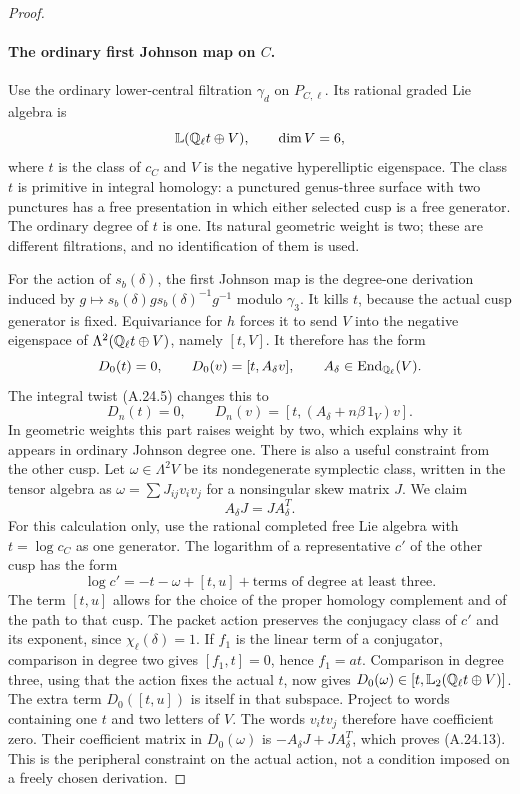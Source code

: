 \begin{proof}
\paragraph{The ordinary first Johnson map on $C$.}
Use the ordinary lower-central filtration $\gamma_d$ on
$P_{C,\ell}$. Its rational graded Lie algebra is
\[
                  \mathbb L(\mathbb Q_\ell t\oplus V),\qquad
                         \dim V=6,
\]
where $t$ is the class of $c_C$ and $V$ is the negative
hyperelliptic eigenspace. The class $t$ is primitive in
integral homology: a punctured genus-three surface with
two punctures has a free presentation in which either
selected cusp is a free generator.
The ordinary degree of $t$ is one. Its natural geometric
weight is two; these are different filtrations, and no
identification of them is used.

For the action of $s_b(\delta)$, the first Johnson map is
the degree-one derivation induced by
$g\mapsto s_b(\delta)g s_b(\delta)^{-1}g^{-1}$
modulo $\gamma_3$. It kills $t$, because the actual cusp
generator is fixed. Equivariance for $h$ forces it to send
$V$ into the negative eigenspace of
$\Lambda^2(\mathbb Q_\ell t\oplus V)$, namely $[t,V]$.
It therefore has the form
\[
             D_0(t)=0,\qquad D_0(v)=[t,A_\delta v],
                \qquad A_\delta\in\operatorname{End}_{\mathbb Q_\ell}(V).
\]
The integral twist (A.24.5) changes this to
\[
       D_n(t)=0,\qquad
       D_n(v)=[t,(A_\delta+n\beta\,1_V)v].               \tag{A.24.8}
\]
In geometric weights this part raises weight by two, which
explains why it appears in ordinary Johnson degree one.
There is also a useful constraint from the other cusp.
Let $\omega\in\Lambda^2V$ be its nondegenerate symplectic
class, written in the tensor algebra as
$\omega=\sum J_{ij}v_iv_j$ for a nonsingular skew matrix
$J$. We claim
\[
                         A_\delta J=J A_\delta^T.
                                                        \tag{A.24.13}
\]
For this calculation only, use the rational completed
free Lie algebra with $t=\log c_C$ as one generator.
The logarithm of a representative $c'$ of the other
cusp has the form
\[
               \log c'=-t-\omega+[t,u]
                         +\text{terms of degree at least three}.
\]
The term $[t,u]$ allows for the choice of the proper
homology complement and of the path to that cusp.
The packet action preserves the conjugacy class of
$c'$ and its exponent, since $\chi_\ell(\delta)=1$.
If $f_1$ is the linear term of a conjugator, comparison
in degree two gives $[f_1,t]=0$, hence $f_1=a t$.
Comparison in degree three, using that the action
fixes the actual $t$, now gives
$D_0(\omega)\in[t,\mathbb L_2(\mathbb Q_\ell t\oplus V)]$.
The extra term $D_0([t,u])$ is itself in that subspace.
Project to words containing one $t$ and two letters of
$V$. The words $v_i t v_j$ therefore have coefficient
zero. Their coefficient matrix in $D_0(\omega)$ is
$-A_\delta J+J A_\delta^T$, which proves (A.24.13).
This is the peripheral constraint on the actual action,
not a condition imposed on a freely chosen derivation.


\end{proof}
